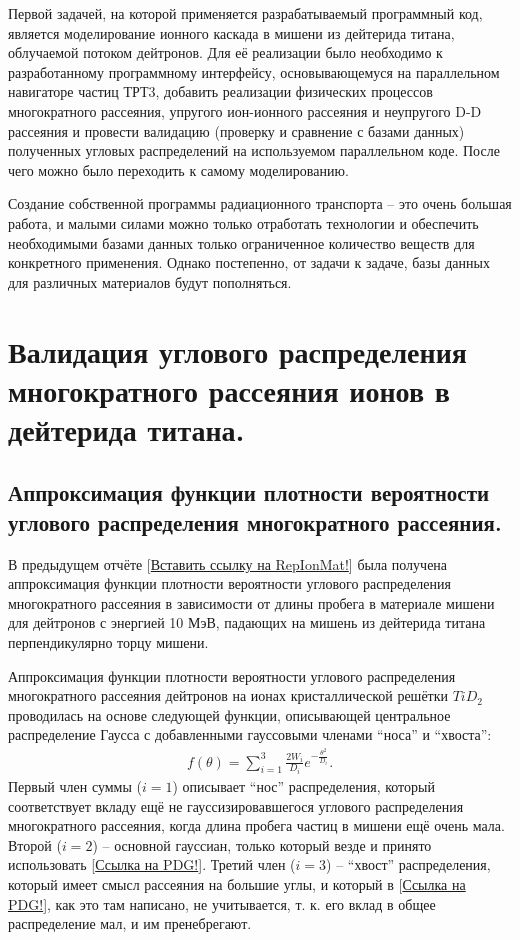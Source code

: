 \documentclass[a4paper,12pt]{article}
\begin{document}
\begin{large}
    Первой задачей, на которой применяется разрабатываемый программный код, является моделирование ионного каскада в мишени из дейтерида титана, облучаемой потоком дейтронов.
    Для её реализации было необходимо к разработанному программному интерфейсу, основывающемуся на параллельном навигаторе частиц ТРТ3, добавить реализации физических процессов многократного рассеяния, упругого ион-ионного рассеяния и неупругого D-D рассеяния и провести валидацию (проверку и сравнение с базами данных) полученных угловых распределений на используемом параллельном коде.
    После чего можно было переходить к самому моделированию. 
   
   Создание собственной программы радиационного транспорта -- это очень большая работа, и малыми силами можно только отработать технологии и обеспечить необходимыми базами данных только ограниченное количество веществ для конкретного применения.
   Однако постепенно, от задачи к задаче, базы данных для различных материалов будут пополняться.
   
   
\clearpage{}
\section{Валидация углового распределения многократного рассеяния ионов в дейтерида титана.}
\label{ValMS}

\subsection{Аппроксимация функции плотности вероятности углового распределения многократного рассеяния.}
\label{subValMS1}

	В предыдущем отчёте [\underline{Вставить ссылку на RepIonMat!}] была получена аппроксимация функции плотности вероятности углового распределения многократного рассеяния в зависимости от длины пробега в материале мишени для дейтронов с энергией 10 МэВ, падающих на мишень из дейтерида титана перпендикулярно торцу мишени.
 
	Аппроксимация функции плотности вероятности углового распределения многократного рассеяния дейтронов на ионах кристаллической решётки $TiD_2$ проводилась на основе следующей функции, описывающей центральное распределение Гаусса с добавленными гауссовыми членами ``носа'' и ``хвоста'':
\begin{equation}
\label{MSApproximationFunction}
\begin{aligned} 
f(\theta)=\sum_{i=1}^{3} \frac{2W_i}{D_i}e^{-\frac{\theta^2}{D_i}}.
\end{aligned}
\end{equation}
  	Первый член суммы ($i=1$) описывает ``нос'' распределения, который соответствует вкладу ещё не гауссизировавшегося углового распределения многократного рассеяния, когда длина пробега частиц в мишени ещё очень мала.
  	Второй ($i=2$) -- основной гауссиан, только который везде и принято использовать [\underline{Ссылка на PDG!}].
  	Третий член ($i=3$) --  ``хвост'' распределения, который имеет смысл рассеяния на большие углы, и который в [\underline{Ссылка на PDG!}], как это там написано, не учитывается, т. к. его вклад в общее распределение мал, и им пренебрегают.
  

\end{large}
\end{document}
